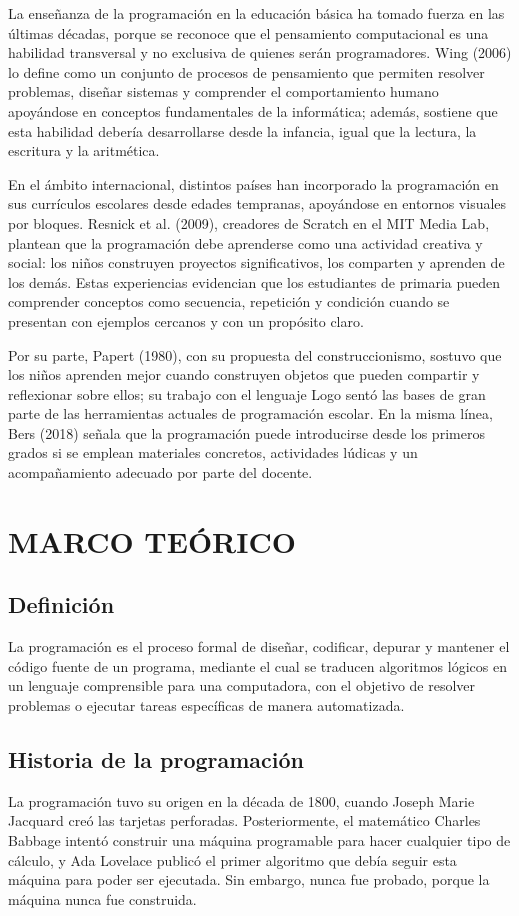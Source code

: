 \documentclass[12pt,letterpaper]{article}
\begin{document}
La enseñanza de la programación en la educación básica ha tomado fuerza en las últimas décadas, porque se reconoce que el pensamiento computacional es una habilidad transversal y no exclusiva de quienes serán programadores. Wing (2006) lo define como un conjunto de procesos de pensamiento que permiten resolver problemas, diseñar sistemas y comprender el comportamiento humano apoyándose en conceptos fundamentales de la informática; además, sostiene que esta habilidad debería desarrollarse desde la infancia, igual que la lectura, la escritura y la aritmética.

En el ámbito internacional, distintos países han incorporado la programación en sus currículos escolares desde edades tempranas, apoyándose en entornos visuales por bloques. Resnick et al. (2009), creadores de Scratch en el MIT Media Lab, plantean que la programación debe aprenderse como una actividad creativa y social: los niños construyen proyectos significativos, los comparten y aprenden de los demás. Estas experiencias evidencian que los estudiantes de primaria pueden comprender conceptos como secuencia, repetición y condición cuando se presentan con ejemplos cercanos y con un propósito claro.

Por su parte, Papert (1980), con su propuesta del construccionismo, sostuvo que los niños aprenden mejor cuando construyen objetos que pueden compartir y reflexionar sobre ellos; su trabajo con el lenguaje Logo sentó las bases de gran parte de las herramientas actuales de programación escolar. En la misma línea, Bers (2018) señala que la programación puede introducirse desde los primeros grados si se emplean materiales concretos, actividades lúdicas y un acompañamiento adecuado por parte del docente.

\section{MARCO TEÓRICO}
\subsection{Definición}
La programación es el proceso formal de diseñar, codificar, depurar y mantener el código fuente de un programa, mediante el cual se traducen algoritmos lógicos en un lenguaje comprensible para una computadora, con el objetivo de resolver problemas o ejecutar tareas específicas de manera automatizada.

\subsection{Historia de la programación}
La programación tuvo su origen en la década de 1800, cuando Joseph Marie Jacquard creó las tarjetas perforadas. Posteriormente, el matemático Charles Babbage intentó construir una máquina programable para hacer cualquier tipo de cálculo, y Ada Lovelace publicó el primer algoritmo que debía seguir esta máquina para poder ser ejecutada. Sin embargo, nunca fue probado, porque la máquina nunca fue construida.
\end{document}
